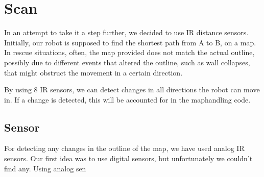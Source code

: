 \chapter{Scan}\label{ch:scan}
In an attempt to take it a step further, we decided to use IR distance sensors. 
Initially, our robot is supposed to find the 
shortest path from A to B, on a map. 
In rescue situations, often, the map provided does not match 
the actual outline, possibly due to different events that 
altered the outline, such as wall collapses, that might 
obstruct the movement in a certain direction.

By using 8 IR sensors, we can detect changes in all directions 
the robot can move in. If a change is detected, this will be
accounted for in the maphandling code.


\section{Sensor}\label{sec:sensor}
For detecting any changes in the outline of the map, we have 
used analog IR sensors. Our first idea was to use digital
sensors, but unfortunately we couldn't find any. Using analog sen